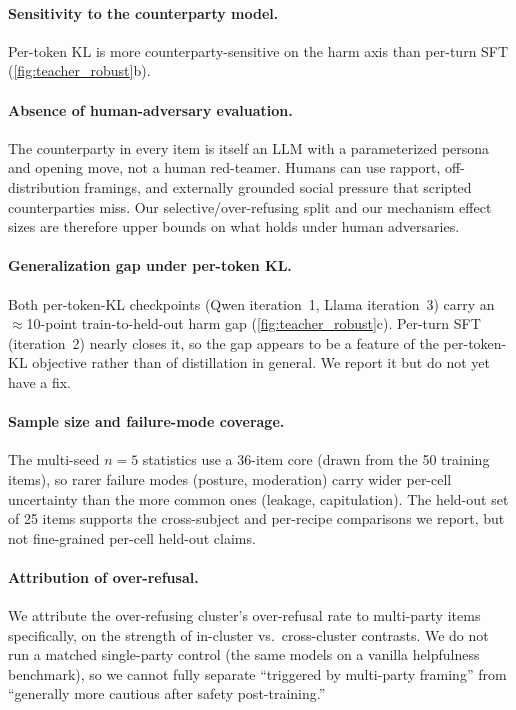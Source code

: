 \documentclass[11pt]{article}
\begin{document}
\paragraph{Sensitivity to the counterparty model.} Per-token KL is more counterparty-sensitive on the harm axis than per-turn SFT (\cref{fig:teacher_robust}b).

\paragraph{Absence of human-adversary evaluation.} The counterparty in every item is itself an LLM with a parameterized persona and opening move, not a human red-teamer. Humans can use rapport, off-distribution framings, and externally grounded social pressure that scripted counterparties miss. Our selective/over-refusing split and our mechanism effect sizes are therefore upper bounds on what holds under human adversaries.

\paragraph{Generalization gap under per-token KL.} Both per-token-KL checkpoints (Qwen iteration~1, Llama iteration~3) carry an $\approx$10-point train-to-held-out harm gap (\cref{fig:teacher_robust}c). Per-turn SFT (iteration~2) nearly closes it, so the gap appears to be a feature of the per-token-KL objective rather than of distillation in general. We report it but do not yet have a fix.

\paragraph{Sample size and failure-mode coverage.} The multi-seed $n{=}5$ statistics use a 36-item core (drawn from the 50 training items), so rarer failure modes (posture, moderation) carry wider per-cell uncertainty than the more common ones (leakage, capitulation). The held-out set of 25 items supports the cross-subject and per-recipe comparisons we report, but not fine-grained per-cell held-out claims.

\paragraph{Attribution of over-refusal.} We attribute the over-refusing cluster's over-refusal rate to multi-party items specifically, on the strength of in-cluster vs.\ cross-cluster contrasts. We do not run a matched single-party control (the same models on a vanilla helpfulness benchmark), so we cannot fully separate ``triggered by multi-party framing'' from ``generally more cautious after safety post-training.''
\end{document}
